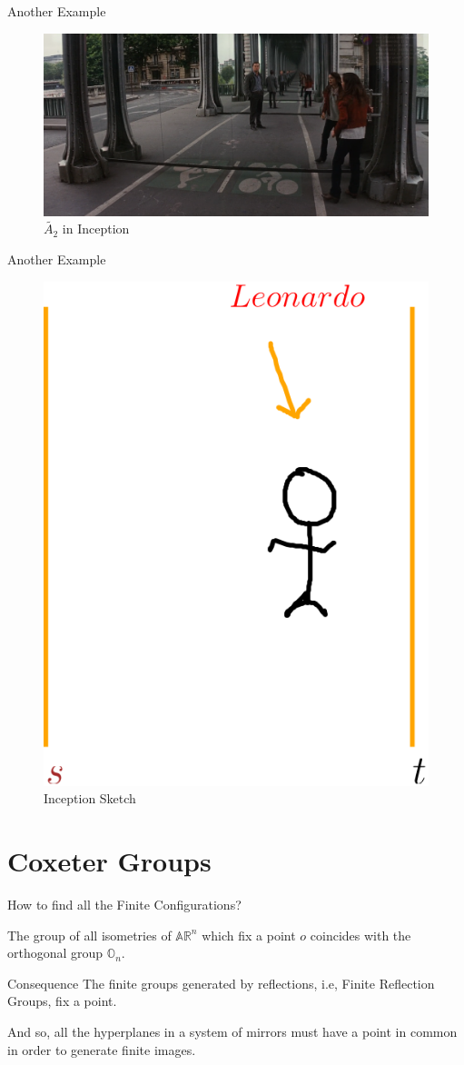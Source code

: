 \documentclass[aspectratio=169,xcolor=dvipsnames]{beamer}
\begin{document}

\begin{frame}{Another Example}
\begin{figure}
    \centering
    \includegraphics[width=1\linewidth]{inceptionMirror.png}
    \caption{$\tilde{A_2}$ in Inception}
    \label{fig:enter-label}
\end{figure}
\end{frame}

\begin{frame}{Another Example}
    \begin{figure}
        \centering
        \includegraphics[width=0.35\linewidth]{leonardo.png}
        \caption{Inception Sketch}
        \label{fig:enter-label}
    \end{figure}

\end{frame}

\section{Coxeter Groups}


\begin{frame}{How to find all the Finite Configurations?}
    \begin{theorem}
        The group of all isometries of $\mathbb{AR}^n$ which fix a point $o$ coincides with the orthogonal group $\mathbb{O}_n$.
    \end{theorem}
    \begin{alertblock}{Consequence}
        The finite groups generated by reflections, i.e, Finite Reflection Groups,
        fix a point.
    \end{alertblock}
    And so, all the hyperplanes in a system of mirrors must have a point in common in order to generate finite images.
\end{frame}
\end{document}
